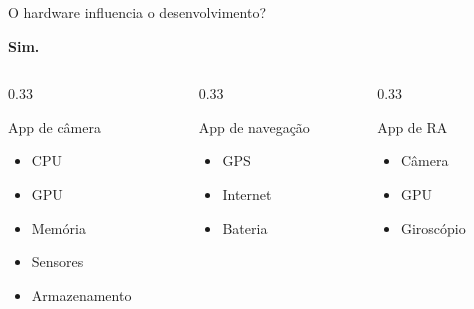 \documentclass[aspectratio=169]{beamer}
\begin{document}
\begin{frame}{O hardware influencia o desenvolvimento?}
    \begin{center}
        \Large\textbf{Sim.}
    \end{center}
    \vspace{0.3em}
    \begin{columns}[T]
        \begin{column}{0.33\textwidth}
            \begin{block}{App de câmera}
                \begin{itemize}
                    \item CPU
                    \item GPU
                    \item Memória
                    \item Sensores
                    \item Armazenamento
                \end{itemize}
            \end{block}
        \end{column}
        \begin{column}{0.33\textwidth}
            \begin{block}{App de navegação}
                \begin{itemize}
                    \item GPS
                    \item Internet
                    \item Bateria
                \end{itemize}
            \end{block}
        \end{column}
        \begin{column}{0.33\textwidth}
            \begin{block}{App de RA}
                \begin{itemize}
                    \item Câmera
                    \item GPU
                    \item Giroscópio
                \end{itemize}
            \end{block}
        \end{column}
    \end{columns}
\end{frame}
\end{document}
